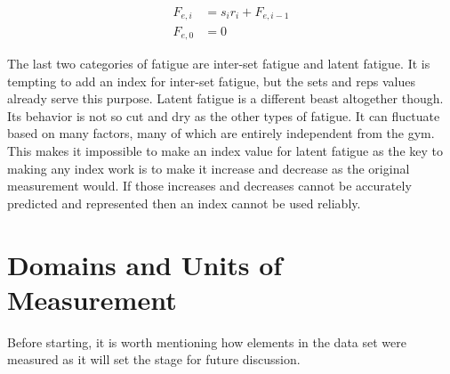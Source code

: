 \begin{equation}
	\label{eq:InterExerciseFatigueEquation}
	\begin{split}
		F_{e,i} & = s_{i}r_{i}+F_{e,i-1} \\
		F_{e,0} & = 0
	\end{split}
\end{equation}

The last two categories of fatigue are inter-set fatigue and latent fatigue. It is tempting to add an index for inter-set fatigue, but the sets and reps values already serve this purpose. Latent fatigue is a different beast altogether though. Its behavior is not so cut and dry as the other types of fatigue. It can fluctuate based on many factors, many of which are entirely independent from the gym. This makes it impossible to make an index value for latent fatigue as the key to making any index work is to make it increase and decrease as the original measurement would. If those increases and decreases cannot be accurately predicted and represented then an index cannot be used reliably.

\section{Domains and Units of Measurement}
\label{sec:UnitsOfMeasurement}

Before starting, it is worth mentioning how elements in the data set were measured as it will set the stage for future discussion.

